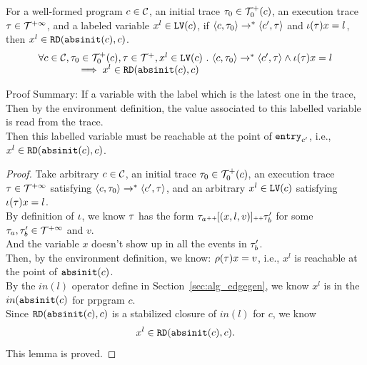 \begin{lem}
\label{lem:inv_live}
For a well-formed program $c \in \mathcal{C}$, an initial trace $\mathtt{\tau}_0 \in \mathcal{T}^{+}_0(c)$, an execution trace $\mathtt{\tau} \in \mathcal{T}^{+\infty} $, and a labeled variable $x^l \in \mathtt{LV}(c)$,
 if 
$\langle c, \mathtt{\tau}_0 \rangle \xrightarrow{}^* \langle c', \mathtt{\tau} \rangle$
and
$\iota(\mathtt{\tau}) x = l $, then $x^l \in \mathtt{RD}(\mathtt{abs}{\mathtt{init}}(c), c)$.
%
\[
	\begin{array}{l}
	\forall c \in \mathcal{C} , \mathtt{\tau}_0 \in \mathcal{T}^{+}_0(c), \mathtt{\tau} \in \mathcal{T}^{+},x^l \in \mathtt{LV}(c) ~.~ 
	\langle c, \mathtt{\tau}_0 \rangle \xrightarrow{}^* \langle c', \mathtt{\tau} \rangle
	\land
	\iota(\mathtt{\tau}) x = l 
	\\ \qquad \qquad \implies x^l \in \mathtt{RD}(\mathtt{abs}{\mathtt{init}}(c), c)
	\end{array}
\]
\end{lem}
Proof Summary: 
If a variable with the label which is the latest one in the trace,
Then by the environment definition, the value associated to this labelled variable is read from the trace.
\\
Then this labelled variable must be reachable at the point of $\mathtt{entry}_{c'}$, i.e., 
$x^l \in \mathtt{RD}(\mathtt{abs}{\mathtt{init}}(c), c)$.
\begin{proof}
	Take arbitrary $c \in \mathcal{C} $, an initial trace $\mathtt{\tau}_0 \in \mathcal{T}^{+}_0(c)$, an execution trace $\mathtt{\tau} \in \mathcal{T}^{+\infty} $ satisfying 
	$\langle c, \mathtt{\tau}_0 \rangle \xrightarrow{}^* \langle c', \mathtt{\tau} \rangle$, 
	and an arbitrary $x^l \in \mathtt{LV}(c)$ satisfying $\iota(\mathtt{\tau}) x = l$.
	\\
	By definition of $\iota$, we know $\mathtt{\tau}$ has the form $\mathtt{\tau}_{a} {\scriptscriptstyle ++} [(x, l, v)] {\scriptscriptstyle ++} \mathtt{\tau}_{b}'$
	for some $\mathtt{\tau}_{a} , \mathtt{\tau}_{b}' \in \mathcal{T}^{+\infty}$ and $v$.
	\\
	And the variable $x$ doesn't show up in all the events in $\mathtt{\tau}_b'$.
%
\\
	Then, by the environment definition, we know:
	$\rho(\mathtt{\tau}) x = v$, i.e., $x^l$ is 
	reachable at the point of 
	$\mathtt{abs}{\mathtt{init}}(c)$.
	\\
	By the $in(l)$ operator define in Section~\ref{sec:alg_edgegen}, we know $x^l$ is in the $in(\mathtt{abs}{\mathtt{init}}(c)$ for prpgram $c$.
	\\
	Since $\mathtt{RD}(\mathtt{abs}{\mathtt{init}}(c), c)$ is a stabilized closure of $in(l)$ for $c$,
	we know 
	$$x^l \in \mathtt{RD}(\mathtt{abs}{\mathtt{init}}(c), c).$$
	This lemma is proved.
\end{proof}